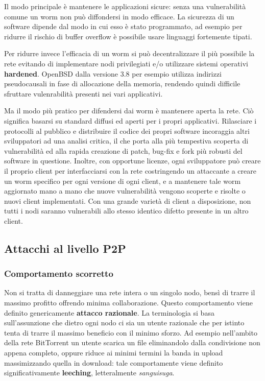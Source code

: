 Il modo principale è mantenere le applicazioni sicure: senza una
vulnerabilità comune un worm non può diffondersi in modo efficace. La
sicurezza di un software dipende dal modo in cui esso è stato
programmato, ad esempio per ridurre il rischio di buffer overflow è
possibile usare linguaggi fortemente tipati.

Per ridurre invece l'efficacia di un worm si può decentralizzare il più
possibile la rete evitando di implementare nodi privilegiati e/o
utilizzare sistemi operativi \textbf{hardened}. OpenBSD dalla versione
3.8 per esempio utilizza indirizzi pseudocausali in fase di allocazione
della memoria, rendendo quindi difficile sfruttare vulenrabilità
presenti nei vari applicativi.

Ma il modo più pratico per difendersi dai worm è mantenere aperta la
rete. Ciò significa basarsi su standard diffusi ed aperti per i propri
applicativi. Rilasciare i protocolli al pubblico e distribuire il codice
dei propri software incoraggia altri sviluppatori ad una analisi
critica, il che porta alla più tempestiva scoperta di vulnerabilità ed
alla rapida creazione di patch, bug-fix e fork più robusti del software
in questione. Inoltre, con opportune licenze, ogni sviluppatore può
creare il proprio client per interfacciarsi con la rete costringendo un
attaccante a creare un worm specifico per ogni versione di ogni client,
e a mantenere tale worm aggiornato mano a mano che nuove vulnerabilità
vengono scoperte e risolte o nuovi client implementati. Con una grande
varietà di client a disposizione, non tutti i nodi saranno vulnerabili
allo stesso identico difetto presente in un altro client.

\subsection{Attacchi al livello P2P}\label{attacchi-al-livello-p2p}

\subsubsection{Comportamento scorretto}\label{comportamento-scorretto}

Non si tratta di danneggiare una rete intera o un singolo nodo, bensì di
trarre il massimo profitto offrendo minima collaborazione. Questo
comportamento viene definito genericamente \textbf{attacco razionale}.
La terminologia si basa sull'assunzione che dietro ogni nodo ci sia un
utente razionale che per istinto tenta di trarre il massimo beneficio
con il minimo sforzo. Ad esempio nell'ambito della rete BitTorrent un
utente scarica un file eliminandolo dalla condivisione non appena
completo, oppure riduce ai minimi termini la banda in upload
massimizzando quella in download: tale comportamente viene definito
significativamente \textbf{leeching}, letteralmente \emph{sanguisuga}.

